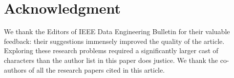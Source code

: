\documentclass[11pt,dvipsnames]{article}
\begin{document}













\section*{Acknowledgment}

We thank the Editors of IEEE Data Engineering Bulletin for their valuable feedback: their suggestions immensely improved the quality of the article. Exploring these research problems required a significantly larger cast of characters than the author list in this paper does justice. We thank the co-authors of all the research papers cited in this article. 






\end{document}
